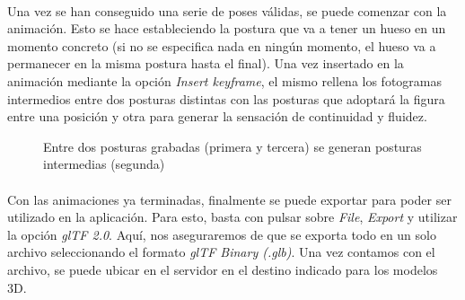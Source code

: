 \documentclass{subfiles}
\begin{document}
    \paragraph{}
    Una vez se han conseguido una serie de poses válidas, se puede comenzar con la animación. Esto se hace estableciendo la postura que va a tener un hueso en un momento concreto (si no se especifica nada en ningún momento, el hueso va a permanecer en la misma postura hasta el final). Una vez insertado en la animación mediante la opción \textit{Insert keyframe}, el mismo \blender rellena los fotogramas intermedios entre dos posturas distintas con las posturas que adoptará la figura entre una posición y otra para generar la sensación de continuidad y fluidez.

    \begin{figure}%
    \centering
    \caption{Entre dos posturas grabadas (primera y tercera) se generan posturas intermedias (segunda)}
    \label{fig:4.2.2_pose_transition}
    \end{figure}

    \paragraph{}
    Con las animaciones ya terminadas, finalmente se puede exportar para poder ser utilizado en la aplicación. Para esto, basta con pulsar sobre \textit{File}, \textit{Export} y utilizar la opción \textit{glTF 2.0}. Aquí, nos aseguraremos de que se exporta todo en un solo archivo seleccionando el formato \textit{glTF Binary (.glb)}. Una vez contamos con el archivo, se puede ubicar en el servidor en el destino indicado para los modelos 3D.
\end{document}
